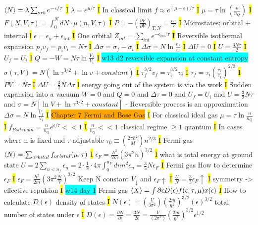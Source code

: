 \documentclass[fontsize=4pt]{scrartcl}
\begin{document}
$\expval{N} = \lambda \sum_{orb} e^{-\epsilon/\tau}$
\hl{I}
$\lambda = e^{\mu / \tau}$
\hl{I}
In classical limit $f \approx e^{(\mu - \epsilon)/\tau}$
\hl{I}
$\mu = \tau \ln (\frac{n}{n_Q})$
\hl{I}
$F(N,V,\tau)=\int_{0}^{N} dN \cdot \mu (n,V,\tau)$
\hl{I}
$P=-(\frac{\partial F}{\partial V})_{T,N}=\frac{n\tau}{V}$
\hl{I}
Microstates: orbital + internal
\hl{l}
$\epsilon = \epsilon_n + \epsilon_{int}$
\hl{I}
One orbital $Z_{int} = \sum_{int} e^{-\epsilon_{int}/\tau}$
\hl{I}
Reversible isothermal expansion $p_f v_f = p_i v_i = N\tau$
\hl{I}
$\Delta \sigma = \sigma_f - \sigma_i$
\hl{I}
$\Delta \sigma = N\ln \frac{v_f}{v_i}$
\hl{I}
$\Delta U = 0$
\hl{I}
$U = \frac{3N \tau}{2}$
\hl{I}
$U_f = U_i$
\hl{I}
$Q = -W = N\tau \ln \frac{V_f}{V_i}$
\hl{I}
\colorbox{Cyan}{w13 d2 reversible expansion at constant entropy}
$\sigma(\tau,V) = N(\ln \tau^{3/2} + \ln v + constant)$
\hl{I}
$\tau_{f}^{3/2} v_f = \tau_i^{3/2} v_i$
\hl{I}
$\tau_f = \tau_i (\frac{v_i}{v_f})^{2/3}$
\hl{I}
$PV=N\tau$
\hl{I}
$\Delta U = \frac{3}{2}N \Delta \tau$
\hl{l}
energy going out of the system is via the work
\hl{I}
Sudden expansion into a vacuum
$W=0$ and $Q=0$ and $\Delta \tau = 0$ and $U_f = U_i$ and $U=\frac{3}{2}N\tau$ and $\sigma = N[\ln V + \ln \tau^{3/2} + constant]$ - Reversible process is an approximation
$\Delta \sigma = N \ln \frac{V_f}{V_i}$
\hl{I}
\colorbox{Orange}{Chapter 7 Fermi and Bose Gas}
\hl{I}
For classical ideal gas
$\mu = \tau \ln \frac{n}{n_Q}$
\hl{I}
$f_{Boltsman} = \frac{n}{n_Q} e^{\epsilon / \tau} << 1$
\hl{I}
$\frac{n}{n_Q} << 1$ classical regime $\geq 1$ quantum 
\hl{I}
In cases where n is fixed and $\tau$ adjustable
$\tau_0 \equiv (\frac{2\pi \hbar^2}{M})n^{2/3}$
\hl{I}
Fermi gas
$\expval{N} = \sum_{orbital}f_{orbital}(\mu, \tau)$
\hl{I}
$\epsilon_F = \frac{\hbar^2}{2m}(3 \pi^2 n)^{3/2}$
\hl{I}
what is total energy at ground state
$U = 2\sum_{n < n_f} \epsilon_n = 2 \cdot \frac{1}{8} \cdot 4\pi \int_{0}^{n_F} dn n^2 \epsilon_n = \frac{3}{5} N \epsilon_F$
\hl{I}
Fermi gas
How to determine $\epsilon_F$
\hl{I}
$\epsilon_F = \frac{\hbar^2}{2m}(3\pi^2 \frac{N}{V})^{3/2}$ Keep N constant $V_{\downarrow}$ and $\epsilon_{F}\uparrow$
\hl{I}
$\frac{U}{N}=\frac{3}{5}\epsilon_{F} \uparrow$
\hl{I}
symmetry -> effective repulsion
\hl{I}
\colorbox{Cyan}{w14 day 1}
Fermi gas 
$\expval{X} = \int \partial \epsilon D(\epsilon) f(\epsilon, \tau,\mu) x(\epsilon)$
\hl{I}
How to calculate $D(\epsilon)$ density of states
\hl{I}
$N(\epsilon) = (\frac{V}{3\pi^2})(\frac{2m}{\hbar^2})^{3/2} (\epsilon)^{3/2}$ total number of states under $\epsilon$
\hl{I}
$D(\epsilon)=\frac{\partial N}{\partial \epsilon} = \frac{3N}{2\epsilon} = \frac{V}{(2\pi^2)}(\frac{2m}{\hbar^2})^{3/2} \epsilon^{1/2}$
\end{document}
